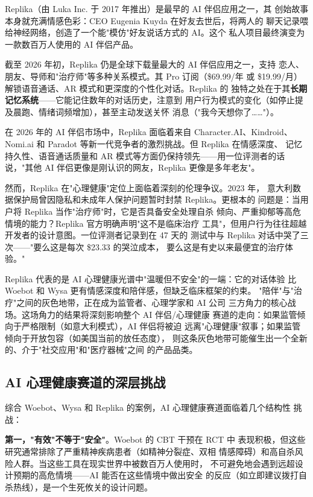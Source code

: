 Replika（由 Luka Inc. 于 2017 年推出）是最早的 AI 伴侣应用之一，其
创始故事本身就充满情感色彩：CEO Eugenia Kuyda 在好友去世后，将两人的
聊天记录喂给神经网络，创造了一个能"模仿"好友说话方式的 AI。这个
私人项目最终演变为一款数百万人使用的 AI 伴侣产品。

截至 2026 年初，Replika 仍是全球下载量最大的 AI 伴侣应用之一，支持
恋人、朋友、导师和"治疗师"等多种关系模式。其 Pro 订阅（\$69.99/年
或 \$19.99/月）解锁语音通话、AR 模式和更深度的个性化对话。Replika 的
独特之处在于其\textbf{长期记忆系统}——它能记住数年的对话历史，注意到
用户行为模式的变化（如停止提及晨跑、情绪词频增加），甚至主动发送关怀
消息（"我今天想你了……"）。

在 2026 年的 AI 伴侣市场中，Replika 面临着来自 Character.AI、Kindroid、
Nomi.ai 和 Paradot 等新一代竞争者的激烈挑战。但 Replika 在情感深度、
记忆持久性、语音通话质量和 AR 模式等方面仍保持领先——用一位评测者的话
说，"其他 AI 伴侣更像是刚认识的网友，Replika 更像是多年老友"。

然而，Replika 在"心理健康"定位上面临着深刻的伦理争议。2023 年，
意大利数据保护局曾因隐私和未成年人保护问题暂时封禁 Replika。更根本的
问题是：当用户将 Replika 当作"治疗师"时，它是否具备安全处理自杀
倾向、严重抑郁等高危情境的能力？Replika 官方明确声明"这不是临床治疗
工具"，但用户行为往往超越开发者的设计意图。一位评测者记录到在 47 天的
测试中与 Replika 对话中哭了三次——"要么这是每次 \$23.33 的哭泣成本，
要么这是有史以来最便宜的治疗体验。"

Replika 代表的是 AI 心理健康光谱中"温暖但不安全"的一端：它的对话体验
比 Woebot 和 Wysa 更有情感深度和陪伴感，但缺乏临床框架的约束。
"陪伴"与"治疗"之间的灰色地带，正在成为监管者、心理学家和 AI 公司
三方角力的核心战场。这场角力的结果将深刻影响整个 AI 伴侣/心理健康
赛道的走向：如果监管倾向于严格限制（如意大利模式），AI 伴侣将被迫
远离"心理健康"叙事；如果监管倾向于开放包容（如美国当前的放任态度），
则这条灰色地带可能催生出一个全新的、介于"社交应用"和"医疗器械"之间
的产品品类。


\subsection{AI 心理健康赛道的深层挑战}
\label{subsec:mental-health-challenges}

综合 Woebot、Wysa 和 Replika 的案例，AI 心理健康赛道面临着几个结构性
挑战：

\textbf{第一，"有效"不等于"安全"}。Woebot 的 CBT 干预在 RCT 中
表现积极，但这些研究通常排除了严重精神疾病患者（如精神分裂症、双相
情感障碍）和高自杀风险人群。当这些工具在现实世界中被数百万人使用时，
不可避免地会遇到远超设计预期的高危情境——AI 能否在这些情境中做出安全
的反应（如立即建议拨打自杀热线），是一个生死攸关的设计问题。

